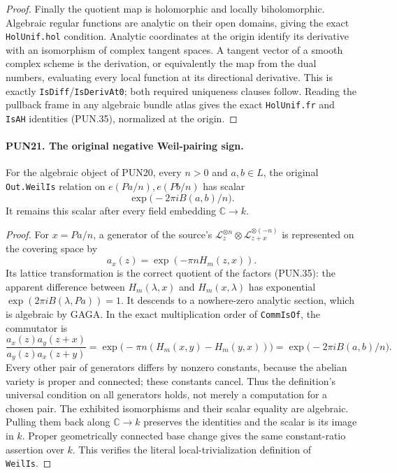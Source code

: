 \documentclass[11pt,a4paper]{article}
\numberwithin{equation}{section}
\theoremstyle{remark}\newtheorem{remark}[theorem]{Remark}
\begin{document}
\begin{proof}
Finally the quotient map is holomorphic and locally biholomorphic.
Algebraic regular functions are analytic on their open domains,
giving the exact \texttt{Hol\allowbreak Unif.\allowbreak hol} condition.  Analytic
coordinates at the origin identify its derivative with an
isomorphism of complex tangent spaces.  A tangent vector of a
smooth complex scheme is the derivation, or equivalently the
map from the dual numbers, evaluating every local function at
its directional derivative.  This is exactly
\texttt{Is\allowbreak Diff}/\texttt{Is\allowbreak Deriv\allowbreak At0}; both required uniqueness
clauses follow.  Reading the pullback frame in any algebraic
bundle atlas gives the exact \texttt{Hol\allowbreak Unif.\allowbreak fr} and
\texttt{Is\allowbreak AH} identities (PUN.35), normalized at the origin.
\end{proof}

\paragraph{PUN21. The original negative Weil-pairing sign.}
\label{claim:PUN21}
For the algebraic object of PUN20, every \(n>0\) and
\(a,b\in L\), the original \texttt{Out.\allowbreak Weil\allowbreak Is} relation on
\(e(Pa/n),e(Pb/n)\) has scalar
\[
                   \exp\bigl(-2\pi i B(a,b)/n\bigr).
 \tag{PUN.36}
\]
It remains this scalar after every field embedding
\(\mathbb C\to k\).

\begin{proof}
For \(x=Pa/n\), a generator of the source's
\(\mathcal L_z^{\otimes n}\otimes
\mathcal L_{z+x}^{\otimes(-n)}\) is represented on the
covering space by
\[
                         a_x(z)=\exp(-\pi n H_m(z,x)).
 \tag{PUN.37}
\]
Its lattice transformation is the correct quotient of the
factors (PUN.35): the apparent difference between
\(H_m(\lambda,x)\) and \(H_m(x,\lambda)\) has exponential
\(\exp(2\pi iB(\lambda,Pa))=1\).
It descends to a nowhere-zero analytic section, which is
algebraic by GAGA.  In the exact multiplication order of
\texttt{Comm\allowbreak Is\allowbreak Of}, the commutator is
\[
 \frac{a_x(z)a_y(z+x)}{a_y(z)a_x(z+y)}
      =\exp\bigl(-\pi n(H_m(x,y)-H_m(y,x))\bigr)
      =\exp\bigl(-2\pi i B(a,b)/n\bigr).
 \tag{PUN.38}
\]
Every other pair of generators differs by nonzero constants,
because the abelian variety is proper and connected; these
constants cancel.  Thus the definition's universal condition on
all generators holds, not merely a computation for a chosen
pair.  The exhibited isomorphisms and their scalar equality
are algebraic.  Pulling them back along \(\mathbb C\to k\)
preserves the identities and the scalar is its image in \(k\).
Proper geometrically connected base change gives the same
constant-ratio assertion over \(k\).  This verifies the literal
local-trivialization definition of \texttt{Weil\allowbreak Is}.
\end{proof}
\end{document}
